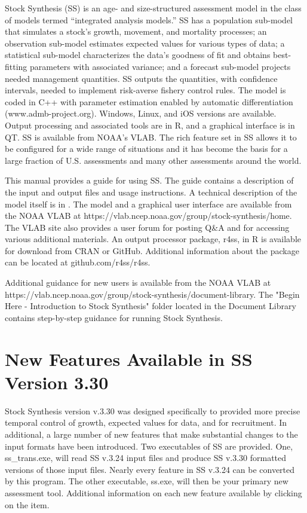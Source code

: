 Stock Synthesis (SS) is an age- and size-structured assessment model in the class of models termed “integrated analysis models.” SS has a population sub-model that simulates a stock’s growth, movement, and mortality processes; an observation sub-model estimates expected values for various types of data; a statistical sub-model characterizes the data’s goodness of fit and obtains best-fitting parameters with associated variance; and a forecast sub-model projects needed management quantities.  SS outputs the quantities, with confidence intervals, needed to implement risk-averse fishery control rules. The model is coded in C++ with parameter estimation enabled by automatic differentiation (www.admb-project.org).  Windows, Linux, and iOS versions are available.  Output processing and associated tools are in R, and a graphical interface is in QT.  SS is available from NOAA’s VLAB. The rich feature set in SS allows it to be configured for a wide range of situations and it has become the basis for a large fraction of U.S. assessments and many other assessments around the world.  

This manual provides a guide for using SS. The guide contains a description of the input and output files and usage instructions. A technical description of the model itself is in \citet{methot_stock_2013}. The model and a graphical user interface are available from the NOAA VLAB at https://vlab.ncep.noaa.gov/group/stock-synthesis/home. The VLAB site also provides a user forum for posting Q\&A and for accessing various additional materials.  An output processor package, r4ss, in R is available for download from CRAN or GitHub. Additional information about the package can be located at github.com/r4ss/r4ss.

Additional guidance for new users is available from the NOAA VLAB at https://vlab.ncep.noaa.gov/group/stock-synthesis/document-library.  The "Begin Here - Introduction to Stock Synthesis" folder located in the Document Library contains step-by-step guidance for running Stock Synthesis.  
	
\section{New Features Available in SS Version 3.30}
Stock Synthesis version v.3.30 was designed specifically to provided more precise temporal control of growth, expected values for data, and for recruitment.  In additional, a large number of new features that make substantial changes to the input formats have been introduced.  Two executables of SS are provided.  One, ss\_trans.exe, will read SS v.3.24 input files and produce SS v.3.30 formatted versions of those input files.  Nearly every feature in SS v.3.24 can be converted by this program.  The other executable, ss.exe, will then be your primary new assessment tool. Additional information on each new feature available by clicking on the item.
		

